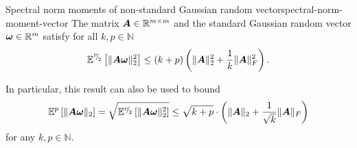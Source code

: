 \documentclass[12pt]{article}
\begin{document}
\begin{lemma}{Spectral norm moments of non-standard Gaussian random vector}{spectral-norm-moment-vector}
    The matrix $\boldsymbol{A} \in \mathbb{R}^{m \times m}$ and the standard Gaussian random vector $\boldsymbol{\omega} \in \mathbb{R}^{m}$ satisfy for all $k,p \in \mathbb{N}$ 
    \begin{equation}
        \mathbb{E}^{{}^{p}{\mskip -5mu/\mskip -3mu}_{2}}\left[ \lVert \boldsymbol{A} \boldsymbol{\omega} \rVert _2^2 \right]
        \leq  (k + p) \left( \lVert \boldsymbol{A} \rVert _2^2 + \frac{1}{k} \lVert \boldsymbol{A} \rVert _F^2 \right).
    \end{equation}
\end{lemma}

\begin{remark}
    In particular, this result can also be used to bound
    \begin{equation}
        \mathbb{E}^{p}\left[ \lVert \boldsymbol{A} \boldsymbol{\omega} \rVert _2 \right] = \sqrt{\mathbb{E}^{{}^{p}{\mskip -5mu/\mskip -3mu}_{2}}\left[ \lVert \boldsymbol{A} \boldsymbol{\omega} \rVert _2^2 \right]} \leq \sqrt{k + p} \cdot \left(\lVert \boldsymbol{A} \rVert _2 + \frac{1}{\sqrt{k}}\lVert \boldsymbol{A} \rVert _F\right)
    \end{equation}
    for any $k,p \in \mathbb{N}$.
\end{remark}
\end{document}
